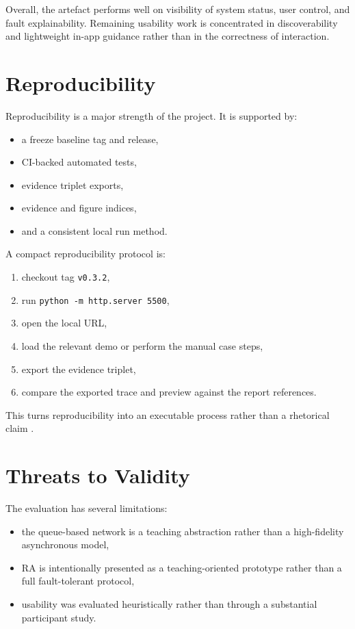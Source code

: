 Overall, the artefact performs well on visibility of system status, user control, and fault explainability. Remaining usability work is concentrated in discoverability and lightweight in-app guidance rather than in the correctness of interaction.

\section{Reproducibility}
Reproducibility is a major strength of the project. It is supported by:
\begin{itemize}
  \item a freeze baseline tag and release,
  \item CI-backed automated tests,
  \item evidence triplet exports,
  \item evidence and figure indices,
  \item and a consistent local run method.
\end{itemize}

A compact reproducibility protocol is:
\begin{enumerate}
  \item checkout tag \texttt{v0.3.2},
  \item run \texttt{python -m http.server 5500},
  \item open the local URL,
  \item load the relevant demo or perform the manual case steps,
  \item export the evidence triplet,
  \item compare the exported trace and preview against the report references.
\end{enumerate}

This turns reproducibility into an executable process rather than a rhetorical claim \cite{sandve2013ten,wilson2014best,wilkinson2016fair}.

\section{Threats to Validity}
The evaluation has several limitations:
\begin{itemize}
  \item the queue-based network is a teaching abstraction rather than a high-fidelity asynchronous model,
  \item RA is intentionally presented as a teaching-oriented prototype rather than a full fault-tolerant protocol,
  \item usability was evaluated heuristically rather than through a substantial participant study.
\end{itemize}


